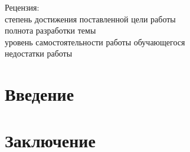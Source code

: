 \documentclass[12pt,chapterprefix=true,headings=onelineappendix]{scrartcl}
\begin{document}
\begin{titlepage}
	\vfill
	\begin{flushleft}
		Рецензия:  \\
		степень достижения поставленной цели работы \hrulefill{} \\
		полнота разработки темы \hrulefill{ } \\
		уровень самостоятельности работы обучающегося \hrulefill{} \\
		недостатки работы \hrulefill{}\\
	\end{flushleft}

\end{titlepage}

\tableofcontents

\newpage{}
\section*{Введение}


\newpage{}
\section*{Заключение}

\newpage
\nocite{*}
\printbibliography[heading=bibintoc]
\end{document}
